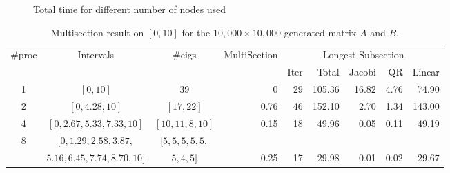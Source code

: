 \begin{figure}[htbp]
	\centering
	\caption{Total time for different number of nodes used}
  \label{fig:timenodes}
\end{figure}

\begin{table*}
\begin{center}
\begin{tabular}{|c | c | c | r | r | r | r | r | r |}
\hline
$\#$proc & Intervals & $\#$eigs & MultiSection & \multicolumn{5}{|c|}{Longest Subsection} \\
  & & &  & Iter & Total & Jacobi & QR & Linear \\
\hline
1 & $[0, 10]$ & 39 & 0 & 29 & 105.36 & 16.82 & 4.76 & 74.90 \\
2 & $[0, 4.28, 10]$ & $[17, 22]$ & 0.76 &  46 & 152.10 & 2.70 & 1.34 & 143.00\\
4 & $[0, 2.67, 5.33, 7.33, 10]$ & $[10, 11, 8, 10]$ & 0.15 & 18 & 49.96 & 0.05 & 0.11 & 49.19 \\
8 &$[0, 1.29, 2.58, 3.87, $ & $[5, 5, 5, 5, 5,$ & &  & & & & \\
& $5.16, 6.45, 7.74, 8.70, 10]$& $5, 4, 5]$& 0.25 & 17 & 29.98 & 0.01 & 0.02 & 29.67\\
\hline
\end{tabular}
\caption{Multisection result on $[0, 10]$ for the $10,000 \times 10,000$ generated matrix $A$ and $B$.}
\label{tab:result-multisection}
\end{center}
\end{table*}

